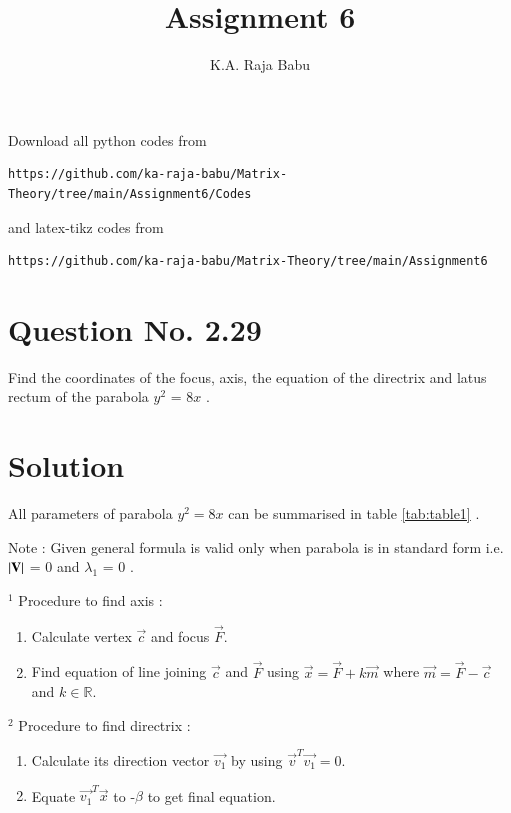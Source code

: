 \documentclass[journal,12pt,twocolumn]{IEEEtran}
\begin{document}
     \def\rightbox#1{\makebox[0in][r]{#1}}
     \def\centbox#1{\makebox[0in]{#1}}
     \def\topbox#1{\raisebox{-\baselineskip}[0in][0in]{#1}}
     \def\midbox#1{\raisebox{-0.5\baselineskip}[0in][0in]{#1}}
\vspace{3cm}
\title{Assignment 6}
\author{K.A. Raja Babu}
\maketitle
\newpage
\bigskip
\renewcommand{\thefigure}{\theenumi}
\renewcommand{\thetable}{\theenumi}
Download all python codes from 
\begin{lstlisting}
https://github.com/ka-raja-babu/Matrix-Theory/tree/main/Assignment6/Codes
\end{lstlisting}
%
and latex-tikz codes from 
%
\begin{lstlisting}
https://github.com/ka-raja-babu/Matrix-Theory/tree/main/Assignment6
\end{lstlisting}
%
\section{Question No. 2.29}
Find the coordinates of the focus, axis, the equation of the directrix and latus rectum of the parabola $y^2$ = 8$x$ .
%
\section{Solution}

All parameters of parabola $y^2=8x$ can be summarised in table \ref{tab:table1} .

Note : Given general formula is valid only when parabola is in standard form i.e. $\left\vert\mathbf{V}\right\vert$ = 0 and $\lambda_1$ = 0 . 

$^{1}$ Procedure to find axis :
\begin{enumerate}
\item Calculate vertex $\vec{c}$ and focus $\vec{F}$.

\item Find equation of line joining $\vec{c}$ and $\vec{F}$ using           $\vec{x}=\vec{F} +k\vec{m}$ where $\vec{m}=\vec{F}-\vec{c}$ and $k \in \mathbb{R}.$
\end{enumerate}

$^{2}$ Procedure to find directrix :
\begin{enumerate}
\item Calculate its direction vector $\vec{v_1}$ by using $\vec{v}^T\vec{v_1} =        0.$
    \item Equate $\vec{v_1}^T\vec{x}$ to -$\beta$ to get final equation.
\end{enumerate}
\end{document}
